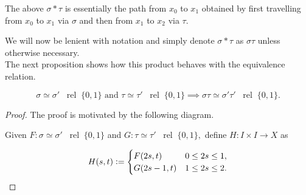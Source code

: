 \documentclass[12pt]{article}
\newcommand{\rel}{\;\;\operatorname{rel}\;}
\begin{document}
The above $\sigma*\tau$ is essentially the path from $x_0$ to $x_1$ obtained by first travelling from $x_0$ to $x_1$ via $\sigma$ and then from $x_1$ to $x_2$ via $\tau.$

We will now be lenient with notation and simply denote $\sigma*\tau$ as $\sigma\tau$ unless otherwise necessary.\\
The next proposition shows how this product behaves with the equivalence relation.

\begin{prop}
	\begin{equation*} 
		\sigma \simeq \sigma' \rel \{0, 1\} \text{ and } \tau \simeq \tau' \rel \{0, 1\} \implies \sigma\tau \simeq \sigma'\tau' \rel \{0, 1\}.
	\end{equation*}
\end{prop}
\begin{proof} 
	The proof is motivated by the following diagram.
	
	\begin{center}	
	\end{center}

	Given $F:\sigma \simeq \sigma' \rel \{0, 1\}$ and $G:\tau \simeq \tau' \rel \{0, 1\},$ define $H:I \times I \to X$ as

	\begin{equation*} 
		H(s, t)\vcentcolon= \begin{cases}
				F(2s, t) & 0 \le 2s \le 1,\\
				G(2s - 1, t) & 1 \le 2s \le 2.
			\end{cases}
	\end{equation*}


\end{proof}
\end{document}
